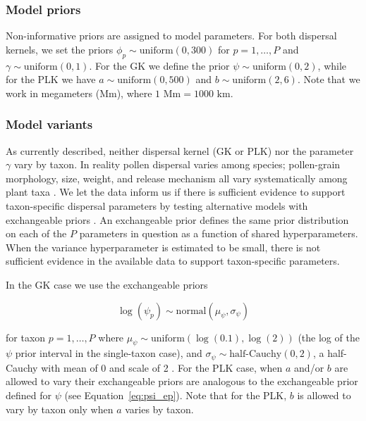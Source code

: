 \documentclass[12pt]{article}
\begin{document}
\subsubsection*{Model priors}

Non-informative priors are assigned to model parameters. For both
dispersal kernels, we set the priors $\phi_p \sim \text{uniform}(0,
300)$ for $p=1, \ldots, P$ and $\gamma \sim \text{uniform}(0,1)$. For
the GK we define the prior $\psi \sim \text{uniform}(0, 2)$, while for
the PLK we have $a \sim \text{uniform}(0, 500)$ and $b \sim
\text{uniform}(2, 6)$. Note that we work in megameters (Mm), where $1
\text{ Mm} = 1000 \text{ km}$.

\subsubsection*{Model variants}
\label{variants}

As currently described, neither dispersal kernel (GK or PLK) nor the
parameter $\gamma$ vary by taxon. In reality pollen dispersal varies
among species; pollen-grain morphology, size, weight, and release
mechanism all vary systematically among plant taxa
\citep{jackson1999pollen}. We let the data inform us if there is
sufficient evidence to support taxon-specific dispersal parameters by
testing alternative models with exchangeable priors
\citep{gelman2014bayesian}. An exchangeable prior defines the same
prior distribution on each of the $P$ parameters in question as a
function of shared hyperparameters. When the variance hyperparameter
is estimated to be small, there is not sufficient evidence in the
available data to support taxon-specific parameters.

In the GK case we use the exchangeable priors
\begin{linenomath*}
\begin{equation}
  \log(\psi_p) \sim \text{normal}( \mu_{\psi}, \sigma_{\psi})
\label{eq:psi_ep}
\end{equation}
\end{linenomath*}
for taxon $p=1, \ldots, P$ where $\mu_{\psi} \sim
\text{uniform}(\log(0.1),\log(2))$ (the log of the $\psi$ prior
interval in the single-taxon case), and $\sigma_{\psi} \sim
\text{half-Cauchy}(0, 2)$, a half-Cauchy with mean of 0 and scale of 2
\citep{gelman2006prior}. For the PLK case, when $a$ and/or $b$ are
allowed to vary their exchangeable priors are analogous to the
exchangeable prior defined for $\psi$ (see
Equation~\ref{eq:psi_ep}). Note that for the PLK, $b$ is allowed to
vary by taxon only when $a$ varies by taxon.
\end{document}
